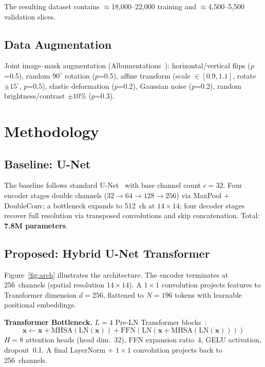 \documentclass[10pt,twocolumn]{article}
\begin{document}
The resulting dataset contains $\approx$18{,}000--22{,}000 training and
$\approx$4{,}500--5{,}500 validation slices.

\subsection{Data Augmentation}
Joint image--mask augmentation (Albumentations~\cite{buslaev2020}):
horizontal/vertical flips ($p$=0.5), random $90^{\circ}$ rotation ($p$=0.5), affine
transform (scale $\in[0.9,1.1]$, rotate $\pm15^{\circ}$, $p$=0.5), elastic deformation
($p$=0.2), Gaussian noise ($p$=0.2), random brightness/contrast $\pm10\%$ ($p$=0.3).

\section{Methodology}

\subsection{Baseline: U-Net}
The baseline follows standard U-Net~\cite{ronneberger2015} with base channel count
$c=32$. Four encoder stages double channels ($32{\to}64{\to}128{\to}256$) via MaxPool +
DoubleConv; a bottleneck expands to 512~ch at $14\!\times\!14$; four decoder stages
recover full resolution via transposed convolutions and skip concatenation.
Total: \textbf{7.8M parameters}.

\subsection{Proposed: Hybrid U-Net Transformer}

Figure~\ref{fig:arch} illustrates the architecture. The encoder terminates at
256~channels (spatial resolution $14\!\times\!14$). A $1\!\times\!1$ convolution
projects features to Transformer dimension $d=256$, flattened to $N=196$ tokens with
learnable positional embeddings.

\textbf{Transformer Bottleneck.} $L=4$ Pre-LN Transformer blocks~\cite{xiong2020}:
\begin{equation}
  \mathbf{x} \leftarrow \mathbf{x} + \mathrm{MHSA}(\mathrm{LN}(\mathbf{x})) +
  \mathrm{FFN}(\mathrm{LN}(\mathbf{x} + \mathrm{MHSA}(\mathrm{LN}(\mathbf{x}))))
\end{equation}
$H=8$ attention heads (head dim.\ 32), FFN expansion ratio~4, GELU activation,
dropout~0.1. A final LayerNorm + $1\!\times\!1$ convolution projects back to
256~channels.
\end{document}

